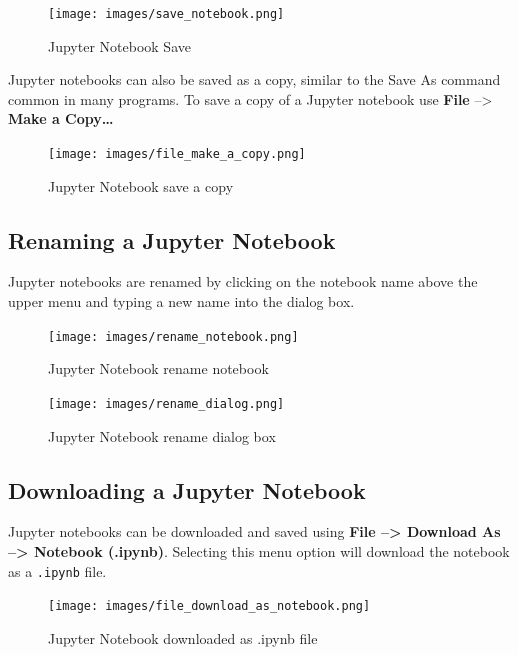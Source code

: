 \documentclass{book}
\begin{document}
\begin{figure}
\centering
\texttt{[image: images/save\_notebook.png]}
\caption{Jupyter Notebook Save}
\end{figure}

Jupyter notebooks can also be saved as a copy, similar to the Save As
command common in many programs. To save a copy of a Jupyter notebook
use \textbf{File} --\textgreater{} \textbf{Make a Copy\ldots{}}

\begin{figure}
\centering
\texttt{[image: images/file\_make\_a\_copy.png]}
\caption{Jupyter Notebook save a copy}
\end{figure}
    




    
        \subsection{Renaming a Jupyter
Notebook}\label{renaming-a-jupyter-notebook}

Jupyter notebooks are renamed by clicking on the notebook name above the
upper menu and typing a new name into the dialog box.

\begin{figure}
\centering
\texttt{[image: images/rename\_notebook.png]}
\caption{Jupyter Notebook rename notebook}
\end{figure}

\begin{figure}
\centering
\texttt{[image: images/rename\_dialog.png]}
\caption{Jupyter Notebook rename dialog box}
\end{figure}
    




    
        \subsection{Downloading a Jupyter
Notebook}\label{downloading-a-jupyter-notebook}

Jupyter notebooks can be downloaded and saved using \textbf{File
--\textgreater{} Download As --\textgreater{} Notebook (.ipynb)}.
Selecting this menu option will download the notebook as a
\lstinline!.ipynb! file.

\begin{figure}
\centering
\texttt{[image: images/file\_download\_as\_notebook.png]}
\caption{Jupyter Notebook downloaded as .ipynb file}
\end{figure}
\end{document}
